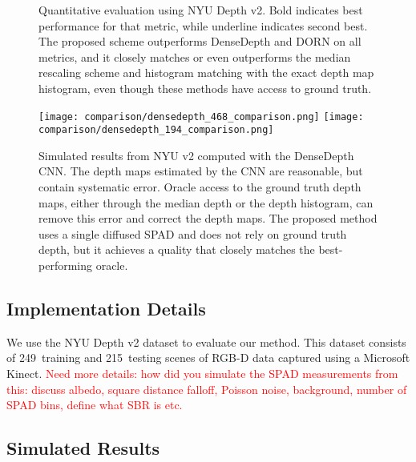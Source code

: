 \begin{figure*}[!t]
\begin{center}

\caption{Quantitative evaluation using NYU Depth v2. Bold indicates best performance for that metric, while underline indicates second best. The proposed scheme outperforms DenseDepth and DORN on all metrics, and it closely matches or even outperforms the median rescaling scheme and histogram matching with the exact depth map histogram, even though these methods have access to ground truth. }
\end{center}
\end{figure*}

\begin{figure*}[!t]
  \texttt{[image: comparison/densedepth\_468\_comparison.png]}
  \texttt{[image: comparison/densedepth\_194\_comparison.png]}
  \caption{Simulated results from NYU v2 computed with the DenseDepth CNN. The depth maps estimated by the CNN are reasonable, but contain systematic error. Oracle access to the ground truth depth maps, either through the median depth or the depth histogram, can remove this error and correct the depth maps. The proposed method uses a single diffused SPAD and does not rely on ground truth depth, but it achieves a quality that closely matches the best-performing oracle.}
	\label{fig:results_simulated}
\end{figure*}


\subsection{Implementation Details}

We use the NYU Depth v2 dataset to evaluate our method. This dataset consists of 249~training and 215~testing scenes of RGB-D data captured using a Microsoft Kinect. \textcolor{red}{Need more details: how did you simulate the SPAD measurements from this: discuss albedo, square distance falloff, Poisson noise, background, number of SPAD bins, define what SBR is etc.}

\subsection{Simulated Results}

